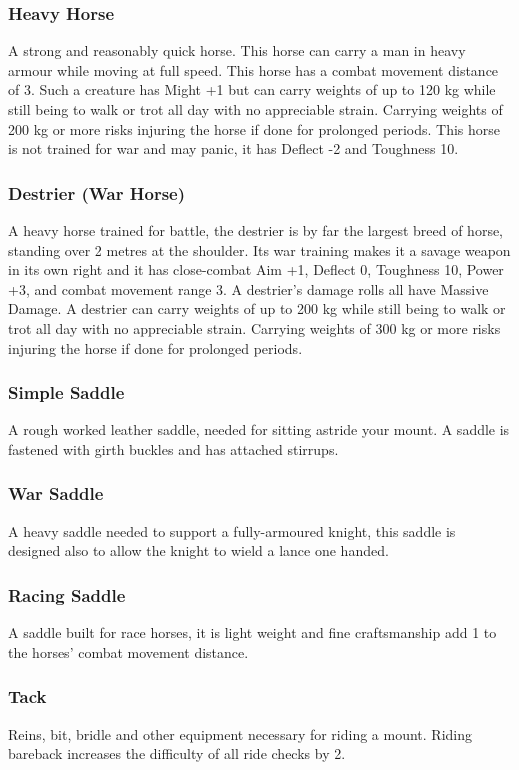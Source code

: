 \documentclass[a4paper,11pt,oneside]{book}
\begin{document}
\subsubsection*{Heavy Horse}
A strong and reasonably quick horse. This horse can carry a man in heavy armour while moving at full speed. This horse has a combat movement distance of 3. Such a creature has Might +1 but can carry weights of up to 120 kg while still being to walk or trot all day with no appreciable strain. Carrying weights of 200 kg or more risks injuring the horse if done for prolonged periods. This horse is not trained for war and may panic, it has Deflect -2 and Toughness 10.

\subsubsection*{Destrier (War Horse)}
A heavy horse trained for battle, the destrier is by far the largest breed of horse, standing over 2 metres at the shoulder. Its war training makes it a savage weapon in its own right and it has close-combat Aim +1, Deflect 0, Toughness 10, Power +3, and combat movement range 3. A destrier's damage rolls all have Massive Damage. A destrier can carry weights of up to 200 kg while still being to walk or trot all day with no appreciable strain. Carrying weights of 300 kg or more risks injuring the horse if done for prolonged periods.

\subsubsection*{Simple Saddle}
A rough worked leather saddle, needed for sitting astride your mount. A saddle is fastened with girth buckles and has attached stirrups.

\subsubsection*{War Saddle}
A heavy saddle needed to support a fully-armoured knight, this saddle is designed also to allow the knight to wield a lance one handed.

\subsubsection*{Racing Saddle}
A saddle built for race horses, it is light weight and fine craftsmanship add 1 to the horses' combat movement distance.

\subsubsection*{Tack}
Reins, bit, bridle and other equipment necessary for riding a mount. Riding bareback increases the difficulty of all ride checks by 2.
\end{document}
